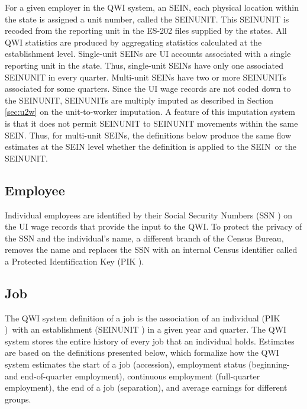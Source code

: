 For a given employer in the QWI system, an SEIN, each physical location
within the state is assigned a unit number, called the SEINUNIT. This
SEINUNIT is recoded from the reporting unit in the ES-202 files supplied by
the states. All QWI statistics are produced by aggregating statistics
calculated at the establishment level. Single-unit SEINs are UI accounts
associated with a single reporting unit in the state. Thus, single-unit
SEINs have only one associated SEINUNIT in every quarter. Multi-unit SEINs
have two or more SEINUNITs associated for some quarters. Since the UI wage
records are not coded down to the SEINUNIT, SEINUNITs are multiply imputed
as described in Section \ref{sec:u2w} on the unit-to-worker imputation. A
feature of this imputation system is that it does not permit SEINUNIT to
SEINUNIT movements within the same SEIN. Thus, for multi-unit SEINs, the
definitions below produce the same flow estimates at the SEIN level whether
the definition is applied to the SEIN\ or the SEINUNIT.

\subsection{Employee}


Individual employees are identified by their Social Security Numbers (SSN%
) on the UI wage records that provide the input to the QWI. To
protect the privacy of the SSN and the individual's name, a different branch
of the Census Bureau, removes the name and replaces the SSN with an internal
Census identifier called a Protected Identification Key (PIK%
).

\subsection{Job}


The QWI system definition of a job is the association of an individual (PIK%
)\ with an establishment (SEINUNIT 
) in a given year and quarter. The QWI system stores the
entire history of every job that an individual holds. Estimates are based on
the definitions presented below, which formalize how the QWI system
estimates the start of a job (accession), employment status (beginning- and
end-of-quarter employment), continuous employment (full-quarter employment),
the end of a job (separation), and average earnings for different groups.

